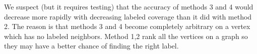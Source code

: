 We suspect (but it requires testing) that the accuracy of methods 3
and 4 would decrease more rapidly with decreasing labeled coverage
than it did with method 2. The reason is that methods 3 and 4 become
completely arbitrary on a vertex which has no labeled neighbors.
Method 1,2 rank all the vertices on a graph so they may have a
better chance of finding the right label. 



%
%

